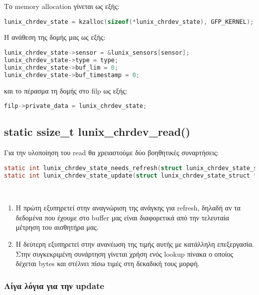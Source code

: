 \documentclass{article}
\begin{document}
Το memory allocation γίνεται ως εξής: \\

\begin{lstlisting}[language=C]
lunix_chrdev_state = kzalloc(sizeof(*lunix_chrdev_state), GFP_KERNEL);
\end{lstlisting} 

Η ανάθεση της δομής μας ως εξής: \\

\begin{lstlisting}[language=C]
lunix_chrdev_state->sensor = &lunix_sensors[sensor];
lunix_chrdev_state->type = type;
lunix_chrdev_state->buf_lim = 0;
lunix_chrdev_state->buf_timestamp = 0;
\end{lstlisting} 

και το πέρασμα τη δομής στο filp ως εξής: \\

\begin{lstlisting}[language=C]
filp->private_data = lunix_chrdev_state;
\end{lstlisting} 

\subsection{static ssize\_t lunix\_chrdev\_read()}
Για την υλοποίηση του read θα χρειαστούμε δύο βοηθητικές συναρτήσεις: \\
\begin{lstlisting}[language=C]
static int lunix_chrdev_state_needs_refresh(struct lunix_chrdev_state_struct *state);
static int lunix_chrdev_state_update(struct lunix_chrdev_state_struct *state);
\end{lstlisting}  \\

\begin{enumerate}
    \item{Η πρώτη εξυπηρετεί στην αναγνώριση της ανάγκης για refresh, δηλαδή αν τα δεδομένα που
        έχουμε στο buffer μας είναι διαφορετικά από την τελευταία μέτρηση του αισθητήρα μας.}
    \item{Η δεύτερη εξυπηρετεί στην ανανέωση της τιμής αυτής με κατάλληλη επεξεργασία. Στην 
        συγκεκριμένη συνάρτηση γίνεται χρήση ενός lookup πίνακα ο οποίος δέχεται bytes και στέλνει
        πίσω τιμές στη δεκαδική τους μορφή.}
\end{enumerate}

\subsubsection{Λίγα λόγια για την update}
\end{document}
